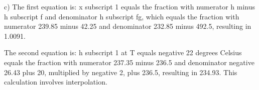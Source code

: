 c) The first equation is:
x subscript 1 equals the fraction with numerator h minus h subscript f and denominator h subscript fg, which equals the fraction with numerator 239.85 minus 42.25 and denominator 232.85 minus 492.5, resulting in 1.0091.

The second equation is:
h subscript 1 at T equals negative 22 degrees Celsius equals the fraction with numerator 237.35 minus 236.5 and denominator negative 26.43 plus 20, multiplied by negative 2, plus 236.5, resulting in 234.93. This calculation involves interpolation.